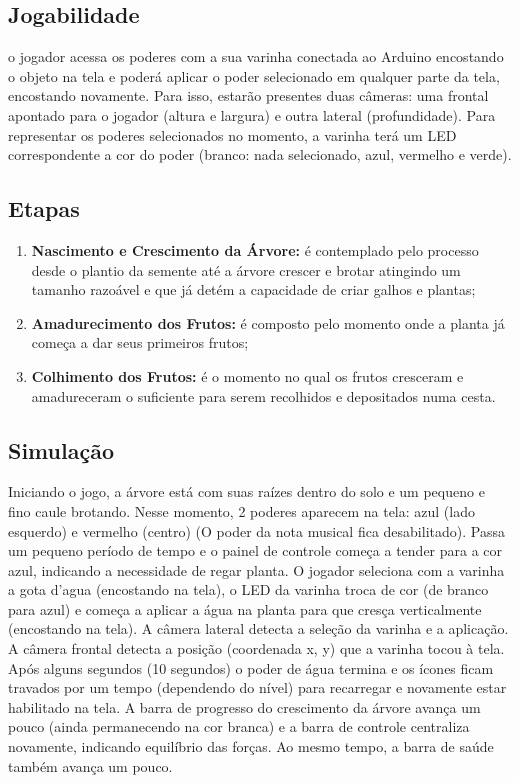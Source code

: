 \documentclass[12pt]{article}
\begin{document}
\subsection{Jogabilidade}
o jogador acessa os poderes com a sua varinha conectada ao Arduino encostando
o objeto na tela e poder\'a aplicar o poder selecionado em qualquer parte da tela,
encostando novamente. Para isso, estar\~ao presentes duas c\^ameras: uma frontal
apontado para o jogador (altura e largura) e outra lateral (profundidade).
Para representar os poderes selecionados no momento, a varinha ter\'a um LED
correspondente a cor do poder (branco: nada selecionado, azul, vermelho e verde).

\subsection{Etapas}
\begin{enumerate}
\item \textbf{Nascimento e Crescimento da \'Arvore:} \'e contemplado pelo processo desde o plantio
 da semente at\'e a \'arvore crescer e brotar atingindo um tamanho razo\'avel e que j\'a det\'em a
 capacidade de criar galhos e plantas;
\item \textbf{Amadurecimento dos Frutos:} \'e composto pelo momento onde a planta j\'a
 começa a dar seus primeiros frutos;
\item \textbf{Colhimento dos Frutos:} \'e o momento no qual os frutos cresceram e amadureceram
 o suficiente para serem recolhidos e depositados numa cesta.
\end{enumerate}

\subsection{Simula\c c\~ao}
Iniciando o jogo, a \'arvore est\'a com suas ra\'izes dentro do solo e um pequeno e fino caule
 brotando. Nesse momento, 2 poderes aparecem na tela: azul (lado esquerdo) e vermelho (centro)
 (O poder da nota musical fica desabilitado). Passa um pequeno per\'iodo de tempo e o painel
 de controle come\c ca a tender para a cor azul, indicando a necessidade de regar planta.
 O jogador seleciona com a varinha a gota d'agua (encostando na tela), o LED da varinha
 troca de cor (de branco para azul) e come\c ca a aplicar a \'agua na planta para que cres\c ca
 verticalmente (encostando na tela). A c\^amera lateral detecta a sele\c c\~ao da varinha e
 a aplica\c c\~ao. A c\^amera frontal detecta a posi\c c\~ao (coordenada x, y) que a varinha
 tocou \`a tela. Ap\'os alguns segundos (10 segundos) o poder de \'agua termina e os \'icones
 ficam travados por um tempo (dependendo do n\'ivel) para recarregar e novamente estar
 habilitado na tela. A barra de progresso do crescimento da \'arvore avança um pouco
 (ainda permanecendo na cor branca) e a barra de controle centraliza novamente, indicando
 equil\'ibrio das for\c cas. Ao mesmo tempo, a barra de sa\'ude tamb\'em avan\c ca um pouco.
\end{document}
